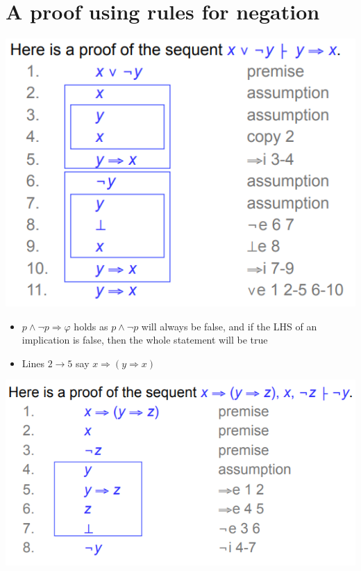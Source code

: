 \documentclass{article}[18pt]
\begin{document}
\section{A proof using rules for negation}
\includegraphics[scale=0.7]{negation_proof1.png}
\begin{itemize}
	\item $p\land\lnot p\Rightarrow \varphi$ holds as $p\land\lnot p$ will always be false, and if the LHS of an implication is false, then the whole statement will be true 
	\item Lines $2\rightarrow 5$ say $x\Rightarrow(y\Rightarrow x)$
\end{itemize}
\includegraphics[scale=0.7]{negation_proof2.png}
\end{document}
